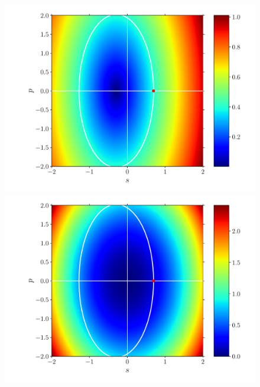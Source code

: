 \documentclass[fleqn]{goose-article}
\begin{document}
\begin{figure}[htp]
\begin{minipage}[t]{.40\textwidth}
    \end{minipage}
    \\
    \begin{minipage}[t]{.31\textwidth}
        \centering
        \includegraphics[width=\textwidth]{example_shear_phase-diagram_eps.pdf}
        \subcaption{$\varepsilon$}
    \end{minipage}
    \hfill
    \begin{minipage}[t]{.31\textwidth}
        \centering
        \includegraphics[width=\textwidth]{example_shear_phase-diagram_energy.pdf}
    \end{minipage}
    \hfill
    \begin{minipage}[t]{.31\textwidth}

\end{minipage}
\end{figure}
\end{document}
